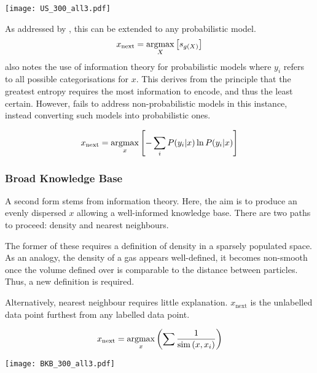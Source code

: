 \begin{center}
  \texttt{[image: US\_300\_all3.pdf]}

\end{center}

As addressed by \textcite{Set09}, this can be extended to any probabilistic model.
\begin{equation}
  \label{eq:x_next1}
  x_\mathrm{next}=\operatorname*{argmax}_X{\left[s_{g(X)}\right]}
\end{equation}
\textcite{Set09} also notes the use of information theory for probabilistic models
where $y_i$ refers to all possible categorisations for $x$. This derives from the principle that the greatest entropy requires the most information to encode, and thus the least certain. However, \textcite{Set09} fails to address non-probabilistic models in this instance, instead converting such models into probabilistic ones.

\begin{equation}
  \label{eq:info_uncertainty}
  x_\mathrm{next}=\operatorname*{argmax}_x{\left[-\sum_i{P(y_i|x)\ln{P(y_i|x)}}\right]}
\end{equation}

\subsubsection{Broad Knowledge Base}
A second form stems from information theory. Here, the aim is to produce an evenly dispersed $x$ allowing a well-informed knowledge base. There are two paths to proceed: density and nearest neighbours.

The former of these requires a definition of density in a sparsely populated space. As an analogy, the density of a gas appears well-defined, it becomes non-smooth once the volume defined over is comparable to the distance between particles. Thus, a new definition is required.

Alternatively, nearest neighbour requires little explanation. $x_\mathrm{next}$ is the unlabelled data point furthest from any labelled data point.

\begin{equation}
  \label{eq:inverseSim}
  x_\mathrm{next}=\operatorname*{argmax}_x{\left(\sum{\frac{1}{\operatorname*{sim}{(x, x_i)}}}\right)}
\end{equation}

\begin{center}
  \texttt{[image: BKB\_300\_all3.pdf]}

\end{center}

